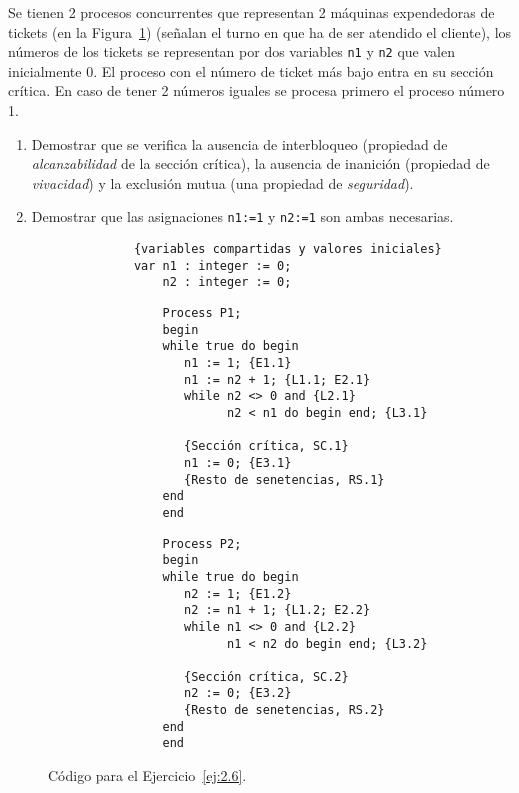 \begin{ejercicio}\label{ej:2.6}
    Se tienen 2 procesos concurrentes que representan 2 máquinas expendedoras de tickets (en la Figura~\ref{fig:cod_6}) (señalan el turno en que ha de ser atendido el cliente), los números de los tickets se representan por dos variables \verb|n1| y \verb|n2| que valen inicialmente 0. El proceso con el número de ticket más bajo entra en su sección crítica. En caso de tener 2 números iguales se procesa primero el proceso número 1.
    \begin{enumerate}[label=(\alph*)]
        \item Demostrar que se verifica la ausencia de interbloqueo (propiedad de \textit{alcanzabilidad} de la sección crítica), la ausencia de inanición (propiedad de \textit{vivacidad}) y la exclusión mutua (una propiedad de \textit{seguridad}).
        \item Demostrar que las asignaciones \verb|n1:=1| y \verb|n2:=1| son ambas necesarias.
    \end{enumerate}

    \begin{figure}[H]
        \centering
        \begin{verbatim}
            {variables compartidas y valores iniciales}
            var n1 : integer := 0;
                n2 : integer := 0;
        \end{verbatim}
        \setlength{\columnsep}{1cm}
        \begin{multicols}{2}
            \begin{verbatim}
                Process P1;
                begin
                while true do begin
                   n1 := 1; {E1.1}
                   n1 := n2 + 1; {L1.1; E2.1}
                   while n2 <> 0 and {L2.1}
                         n2 < n1 do begin end; {L3.1}

                   {Sección crítica, SC.1}
                   n1 := 0; {E3.1}
                   {Resto de senetencias, RS.1}
                end
                end
            \end{verbatim}
            \begin{verbatim}
                Process P2;
                begin
                while true do begin
                   n2 := 1; {E1.2}
                   n2 := n1 + 1; {L1.2; E2.2}
                   while n1 <> 0 and {L2.2}
                         n1 < n2 do begin end; {L3.2}

                   {Sección crítica, SC.2}
                   n2 := 0; {E3.2}
                   {Resto de senetencias, RS.2}
                end
                end
            \end{verbatim}
        \end{multicols}
        \caption{Código para el Ejercicio~\ref{ej:2.6}.}
        \label{fig:cod_6}
    \end{figure}
\end{ejercicio}

